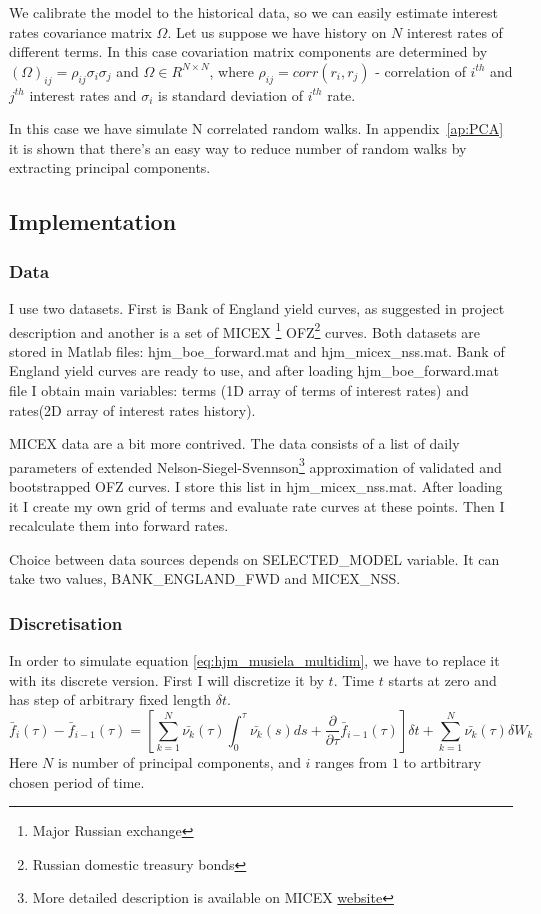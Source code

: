 \documentclass[11pt]{article} %
\begin{document}
We calibrate the model to the historical data, so we can easily estimate interest rates covariance matrix $\Omega$. Let us suppose we have history on $N$ interest rates of different terms. In this case covariation matrix components are determined by $(\Omega)_{ij} = \rho_{ij}\sigma_{i}\sigma_{j}$ and $\Omega \in R^{N \times N}$, where $\rho_{ij} = corr(r_i,r_j)$ - correlation of $i^{th}$ and $j^{th}$ interest rates and $\sigma_i$ is standard deviation of $i^{th}$ rate.

In this case we have simulate N correlated random walks. In appendix~\ref{ap:PCA} it is shown that there's an easy way to reduce number of random walks by extracting principal components.


\subsection{Implementation}
\subsubsection{Data}
I use two datasets. First is Bank of England yield curves, as suggested in project description and another is a set of MICEX \footnote{Major Russian exchange} OFZ\footnote{Russian domestic treasury bonds} curves. 
Both datasets are stored in Matlab files: hjm\_boe\_forward.mat and hjm\_micex\_nss.mat.
Bank of England yield curves are ready to use, and after loading hjm\_boe\_forward.mat file I obtain main variables: terms (1D array of terms of interest rates) and rates(2D array of interest rates history). 

MICEX data are a bit more contrived. The data consists of a list of daily parameters of extended Nelson-Siegel-Svennson\footnote{More detailed description is available on MICEX \href{http://rts.micex.ru/a80}{website}} approximation of validated and bootstrapped OFZ curves. I store this list in hjm\_micex\_nss.mat. After loading it I create my own grid of terms and evaluate rate curves at these points. Then I recalculate them into forward rates.

Choice between data sources depends on SELECTED\_MODEL variable. It can take two values, BANK\_ENGLAND\_FWD and MICEX\_NSS.

\subsubsection{Discretisation}
In order to simulate equation \eqref{eq:hjm_musiela_multidim}, we have to replace it with its discrete version. First I will discretize it by $t$. Time $t$ starts at zero and has step of arbitrary fixed length $\delta t$.
\begin{equation}
\bar{f}_i(\tau) - \bar{f}_{i-1}(\tau) = \left[\sum_{k=1}^N\bar{\nu_k}(\tau)\int_{0}^{\tau}\bar{\nu_k}(s)ds+ \frac{\partial}{\partial \tau}\bar{f}_{i-1}(\tau)\right]\delta t + \sum_{k=1}^N\bar{\nu_k}(\tau)\delta W_{k}
\end{equation}
Here $N$ is number of principal components, and $i$ ranges from $1$ to artbitrary chosen period of time.
\end{document}
